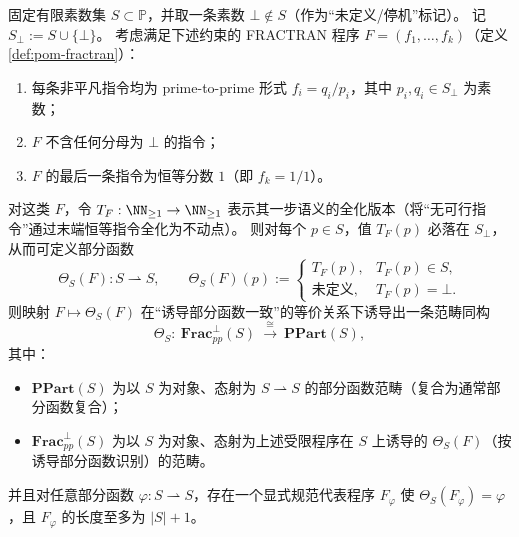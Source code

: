 \begin{theorem}\label{thm:pom-fractran-primecore-finite-partial-function-category}
固定有限素数集 \(S\subset\mathbb P\)，并取一条素数 \(\bot\notin S\)（作为“未定义/停机”标记）。
记 \(S_\bot:=S\cup\{\bot\}\)。
考虑满足下述约束的 FRACTRAN 程序 \(F=(f_1,\dots,f_k)\)（定义 \ref{def:pom-fractran}）：
\begin{enumerate}
  \item 每条非平凡指令均为 prime-to-prime 形式 \(f_i=q_i/p_i\)，其中 \(p_i,q_i\in S_\bot\) 为素数；
  \item \(F\) 不含任何分母为 \(\bot\) 的指令；
  \item \(F\) 的最后一条指令为恒等分数 \(1\)（即 \(f_k=1/1\)）。
\end{enumerate}
对这类 \(F\)，令 \(T_F:\NN_{\ge 1}\to\NN_{\ge 1}\) 表示其一步语义的全化版本（将“无可行指令”通过末端恒等指令全化为不动点）。
则对每个 \(p\in S\)，值 \(T_F(p)\) 必落在 \(S_\bot\)，从而可定义部分函数
\[
\Theta_S(F):S\rightharpoonup S,
\qquad
\Theta_S(F)(p):=
\begin{cases}
T_F(p),& T_F(p)\in S,\\
\text{未定义},& T_F(p)=\bot.
\end{cases}
\]
则映射 \(F\mapsto \Theta_S(F)\) 在“诱导部分函数一致”的等价关系下诱导出一条范畴同构
\[
\Theta_S:\ \mathbf{Frac}_{pp}^{\bot}(S)\ \xrightarrow{\ \cong\ }\ \mathbf{PPart}(S),
\]
其中：
\begin{itemize}
  \item \(\mathbf{PPart}(S)\) 为以 \(S\) 为对象、态射为 \(S\rightharpoonup S\) 的部分函数范畴（复合为通常部分函数复合）；
  \item \(\mathbf{Frac}_{pp}^{\bot}(S)\) 为以 \(S\) 为对象、态射为上述受限程序在 \(S\) 上诱导的 \(\Theta_S(F)\)（按诱导部分函数识别）的范畴。
\end{itemize}
并且对任意部分函数 \(\varphi:S\rightharpoonup S\)，存在一个显式规范代表程序 \(F_\varphi\) 使 \(\Theta_S(F_\varphi)=\varphi\)，且 \(F_\varphi\) 的长度至多为 \(|S|+1\)。
\end{theorem}
